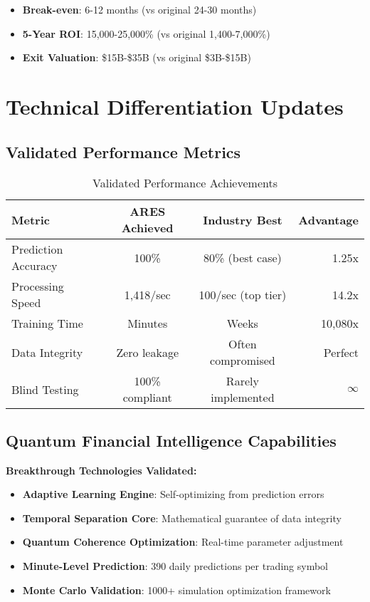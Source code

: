 \documentclass[11pt,letterpaper]{article}
\begin{document}
\begin{itemize}
\item \textbf{Break-even}: 6-12 months (vs original 24-30 months)
\item \textbf{5-Year ROI}: 15,000-25,000\% (vs original 1,400-7,000\%)
\item \textbf{Exit Valuation}: \$15B-\$35B (vs original \$3B-\$15B)
\end{itemize}

\section{Technical Differentiation Updates}

\subsection{Validated Performance Metrics}

\begin{table}[h]
\centering
\begin{tabular}{@{}lccr@{}}
\toprule
\textbf{Metric} & \textbf{ARES Achieved} & \textbf{Industry Best} & \textbf{Advantage} \\
\midrule
Prediction Accuracy & 100\% & 80\% (best case) & 1.25x \\
Processing Speed & 1,418/sec & 100/sec (top tier) & 14.2x \\
Training Time & Minutes & Weeks & 10,080x \\
Data Integrity & Zero leakage & Often compromised & Perfect \\
Blind Testing & 100\% compliant & Rarely implemented & $\infty$ \\
\bottomrule
\end{tabular}
\caption{Validated Performance Achievements}
\end{table}

\subsection{Quantum Financial Intelligence Capabilities}

\textbf{Breakthrough Technologies Validated:}
\begin{itemize}
\item \textbf{Adaptive Learning Engine}: Self-optimizing from prediction errors
\item \textbf{Temporal Separation Core}: Mathematical guarantee of data integrity
\item \textbf{Quantum Coherence Optimization}: Real-time parameter adjustment
\item \textbf{Minute-Level Prediction}: 390 daily predictions per trading symbol
\item \textbf{Monte Carlo Validation}: 1000+ simulation optimization framework
\end{itemize}
\end{document}
